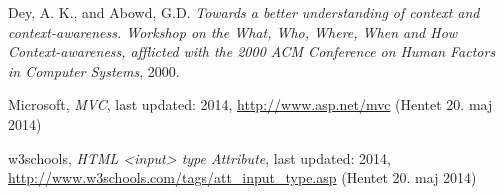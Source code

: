 \documentclass[../report.tex]{subfiles}
\begin{document}
\graphicspath{{img/}{../img/}}
\begingroup
\renewcommand{\chapter}[2]{}%
\begin{thebibliography}{}

  Dey, A. K., and Abowd, G.D.
  \emph{Towards a better understanding of context and context-awareness. Workshop on the What, Who, Where, When and How Context-awareness, afflicted with the 2000 ACM Conference on Human Factors in Computer Systems},
  2000. 

Microsoft, \textit{MVC}, last updated: 2014, \url{http://www.asp.net/mvc} (Hentet  20. maj 2014)

w3schools, \textit{HTML <input> type Attribute}, last updated: 2014,  \url{http://www.w3schools.com/tags/att\_input\_type.asp} (Hentet 20. maj 2014)

\end{thebibliography}
\endgroup
\end{document}
